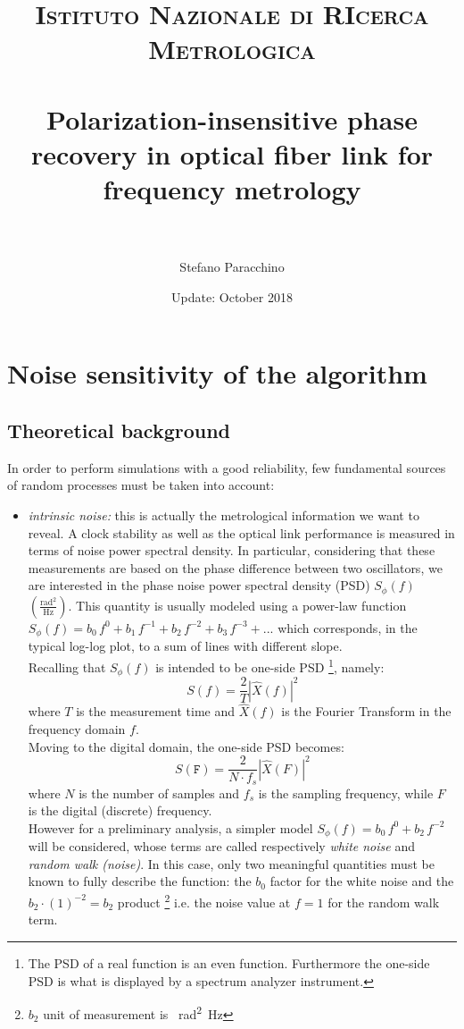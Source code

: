 \documentclass[ fontsize=11pt]{scrartcl} %
\title{	
\normalfont \normalsize 
\textsc{Istituto Nazionale di RIcerca Metrologica } \\ [10pt]
\horrule{0.7pt} \\[0.4cm] %
\huge Polarization-insensitive phase recovery in optical fiber link for frequency metrology \\ %
\horrule{3pt} \\[0.5cm] %
}
\author{Stefano Paracchino} %
\date{Update: October 2018} %
\numberwithin{equation}{section} %
\numberwithin{figure}{section} %
\numberwithin{table}{section} %
\begin{document}
\maketitle
\tableofcontents 
\pagebreak

\section{Noise sensitivity of the algorithm}
\subsection{Theoretical background}\label{back}

In order to perform simulations with a good reliability, few fundamental sources of random processes must be taken into account:

\begin{itemize}
\item \textsl{intrinsic noise:} this is actually the metrological information we want to reveal. A clock stability as well as the optical link performance is measured in terms of noise power spectral density. In particular, considering that these measurements are based on the phase difference between two oscillators, we are interested in the phase noise power spectral density (PSD) $S_{\phi}(f)$ $\left(\frac{\text{rad}^2}{\text{Hz}}\right)$.
This quantity is usually modeled using a power-law function $S_{\phi}(f)=b_0 \, f^{0} + b_1 \, f^{-1}+ b_2 \, f^{-2}+ b_3 \, f^{-3}+...$ which corresponds, in the typical log-log plot, to a sum of lines with different slope.\\
Recalling that $S_{\phi}(f)$ is intended to be one-side PSD \footnote{The PSD of a real function is an even function. Furthermore the one-side PSD is what is displayed by a spectrum analyzer instrument.}, namely:
\begin{equation}
S(f)=\frac{2}{T}\left|\hat{X}(f)\right|^2
\end{equation}
where $T$ is the measurement time and $\hat{X}(f)$ is the Fourier Transform in the frequency domain $f$. \\
Moving to the digital domain, the one-side PSD becomes:
\begin{equation}
S(\mathtt{F})=\frac{2}{N\cdot f_s}\left|\hat{X}(F)\right|^2
\end{equation}
where $N$ is the number of samples and $f_s$ is the sampling frequency, while $F$ is the digital (discrete) frequency.\\
However for a preliminary analysis, a simpler model $S_{\phi}(f)=b_0 \, f^{0} + b_2 \, f^{-2}$ will be considered, whose terms are called respectively \textit{white noise}  and \textit{random walk (noise)}.  In this case, only two meaningful quantities must be known to fully describe the function: the $b_0$ factor for the white noise and the $b_2 \cdot(1)^{-2}=b_2$  product \footnote{$b_2$ unit of measurement is \SI{}{\radian\squared\hertz}} i.e. the noise value at $f=1$ for the random walk term.


\end{itemize}
\end{document}
